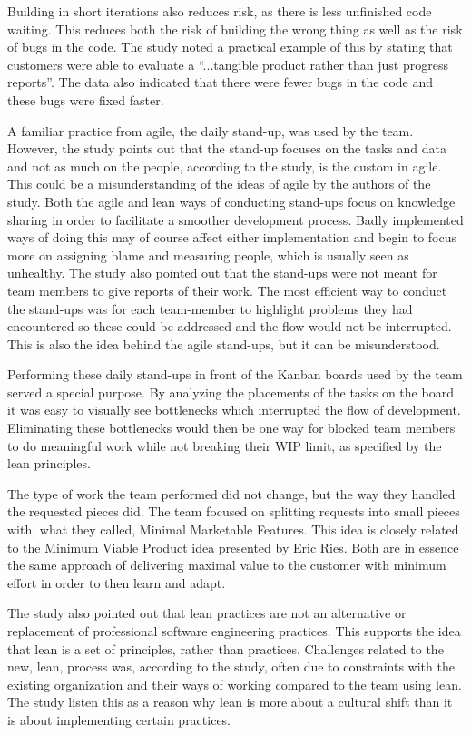 Building in short iterations also reduces risk, as there is less unfinished code waiting. This reduces both the risk of building the wrong thing as well as the risk of bugs in the code. The study noted a practical example of this by stating that customers were able to evaluate a ``...tangible product rather than just progress reports''. The data also indicated that there were fewer bugs in the code and these bugs were fixed faster.\cite{Middleton2012Lean}

A familiar practice from agile, the daily stand-up, was used by the team. However, the study points out that the stand-up focuses on the tasks and data and not as much on the people, according to the study, is the custom in agile.\cite{Middleton2012Lean} This could be a misunderstanding of the ideas of agile by the authors of the study. Both the agile and lean ways of conducting stand-ups focus on knowledge sharing in order to facilitate a smoother development process. Badly implemented ways of doing this may of course affect either implementation and begin to focus more on assigning blame and measuring people, which is usually seen as unhealthy. The study also pointed out that the stand-ups were not meant for team members to give reports of their work. The most efficient way to conduct the stand-ups was for each team-member to highlight problems they had encountered so these could be addressed and the flow would not be interrupted.\cite{Middleton2012Lean} This is also the idea behind the agile stand-ups, but it can be misunderstood.

Performing these daily stand-ups in front of the Kanban boards used by the team served a special purpose. By analyzing the placements of the tasks on the board it was easy to visually see bottlenecks which interrupted the flow of development. Eliminating these bottlenecks would then be one way for blocked team members to do meaningful work while not breaking their WIP limit, as specified by the lean principles.\cite{Middleton2012Lean}

The type of work the team performed did not change, but the way they handled the requested pieces did. The team focused on splitting requests into small pieces with, what they called, Minimal Marketable Features.\cite{Middleton2012Lean} This idea is closely related to the Minimum Viable Product idea presented by Eric Ries. \cite{ries2011lean} Both are in essence the same approach of delivering maximal value to the customer with minimum effort in order to then learn and adapt.

The study also pointed out that lean practices are not an alternative or replacement of professional software engineering practices.\cite{Middleton2012Lean} This supports the idea that lean is a set of principles, rather than practices. Challenges related to the new, lean, process was, according to the study, often due to constraints with the existing organization and their ways of working compared to the team using lean. The study listen this as a reason why lean is more about a cultural shift than it is about implementing certain practices. \cite{Middleton2012Lean}


